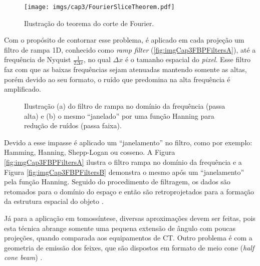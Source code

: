 \begin{figure}[H]
	\caption{Ilustração do teorema do corte de Fourier.}
	\begin{center}
		\texttt{[image: imgs/cap3/FourierSliceTheorem.pdf]}
	\end{center}
	\label{fig:imgCap3FourierSliceTheorem}
\end{figure}

Com o propósito de contornar esse problema, é aplicado em cada projeção um filtro de rampa \acs{1D}, conhecido como \textit{ramp filter} (\ref{fig:imgCap3FBPFiltersA}), até a frequência de Nyquist $\frac{1}{2 \varDelta x}$, no qual $\varDelta x$ é o tamanho espacial do \textit{pixel}. Esse filtro faz com que as baixas frequências sejam atenuadas mantendo somente as altas, porém devido ao seu formato, o ruído que predomina na alta frequência é amplificado. 

\begin{figure}[H]
	\centering
	
	\caption{Ilustração (a) do filtro de rampa no domínio da frequência (passa alta) e (b) o mesmo ``janelado'' por uma função Hanning para redução de ruídos (passa faixa).}
	
	\hfil
	\hfil
	
	\label{fig:imgCap3FBPFilters}
\end{figure}

Devido a esse impasse é aplicado um ``janelamento'' no filtro, como por exemplo: Hamming, Hanning, Shepp-Logan ou cosseno. A Figura \ref{fig:imgCap3FBPFiltersA} ilustra o filtro rampa no domínio da frequência e a Figura \ref{fig:imgCap3FBPFiltersB} demonstra o mesmo após um ``janelamento'' pela função Hanning. Seguido do procedimento de filtragem, os dados são retomados para o domínio do espaço e então são retroprojetados para a formação da estrutura espacial do objeto \cite{xu2014tomographic}. 

Já para a aplicação em tomossíntese, diversas aproximações devem ser feitas, pois esta técnica abrange somente uma pequena extensão de ângulo com poucas projeções, quando comparada aos equipamentos de \acs{CT}. Outro problema é com a geometria de emissão dos feixes, que são dispostos em formato de meio cone (\textit{half cone beam}) \cite{mertelmeier2014filtered}. 

